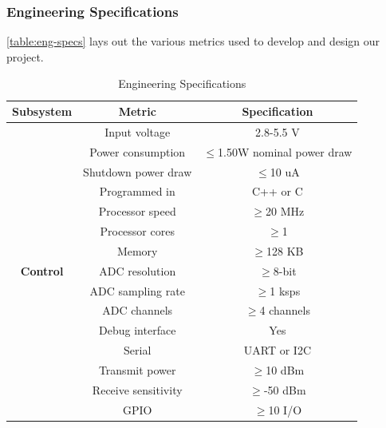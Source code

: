 \subsubsection{Engineering Specifications}
\autoref{table:eng-specs} lays out the various metrics used to develop and design our project. 
\begin{table}[H]
    \caption{Engineering Specifications}
    \centering
    \begin{tabular}{c|c|c}
        \hline
        \textbf{Subsystem} & \textbf{Metric} & \textbf{Specification} \\\cline{2-3}
        \hline
        \multirow{19}{*}{\textbf{Control}} & Input voltage & 2.8-5.5 V \\ \cline{2-3}
                                        & Power consumption & $\leq$1.50W nominal power draw \\ \cline{2-3}
                                        & Shutdown power draw   & $\leq$10 uA \\ \cline{2-3}
                                        & Programmed in         & C++ or C \\ \cline{2-3}
                                        & Processor speed       & $\geq$20 MHz \\ \cline{2-3}
                                        & Processor cores       & $\geq$1 \\ \cline{2-3}
                                        & Memory                & $\geq$128 KB \\ \cline{2-3}
                                        & ADC resolution        & $\geq$8-bit \\ \cline{2-3}
                                        & ADC sampling rate     & $\geq$1 ksps \\ \cline{2-3}
                                        & ADC channels          & $\geq$4 channels \\ \cline{2-3}
                                        & Debug interface       & Yes \\ \cline{2-3}
                                        & Serial                & UART or I2C \\ \cline{2-3}
                                        & Transmit power        & $\geq$10 dBm \\ \cline{2-3}
                                        & Receive sensitivity   & $\geq$-50 dBm \\ \cline{2-3}
                                        & GPIO                  & $\geq$10 I/O \\ \cline{2-3}

\end{tabular}
\end{table}
